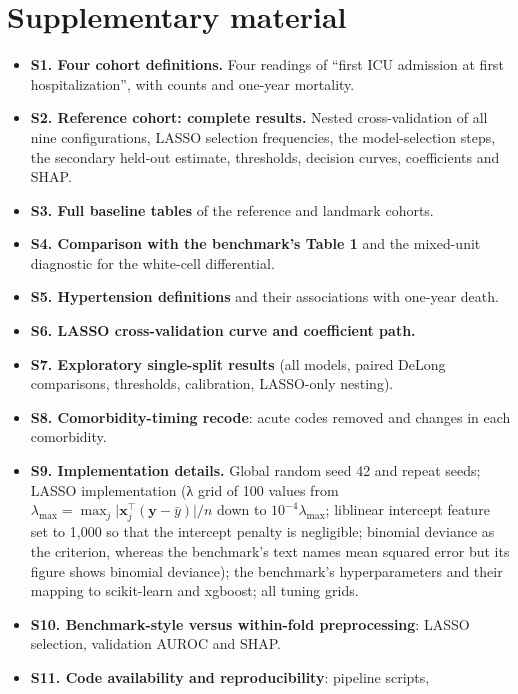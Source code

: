 \hypertarget{supplementary-material}{%
\section{Supplementary material}\label{supplementary-material}}

\begin{itemize}
\tightlist
\item
  \textbf{S1. Four cohort definitions.} Four readings of ``first ICU
  admission at first hospitalization'', with counts and one-year
  mortality.
\item
  \textbf{S2. Reference cohort: complete results.} Nested
  cross-validation of all nine configurations, LASSO selection
  frequencies, the model-selection steps, the secondary held-out
  estimate, thresholds, decision curves, coefficients and SHAP.
\item
  \textbf{S3. Full baseline tables} of the reference and landmark
  cohorts.
\item
  \textbf{S4. Comparison with the benchmark's Table 1} and the
  mixed-unit diagnostic for the white-cell differential.
\item
  \textbf{S5. Hypertension definitions} and their associations with
  one-year death.
\item
  \textbf{S6. LASSO cross-validation curve and coefficient path.}
\item
  \textbf{S7. Exploratory single-split results} (all models, paired
  DeLong comparisons, thresholds, calibration, LASSO-only nesting).
\item
  \textbf{S8. Comorbidity-timing recode}: acute codes removed and
  changes in each comorbidity.
\item
  \textbf{S9. Implementation details.} Global random seed 42 and repeat
  seeds; LASSO implementation (λ grid of 100 values from
  \(\lambda_{\max} = \max_j \lvert\mathbf{x}_j^\top(\mathbf{y} - \bar y)\rvert / n\)
  down to \(10^{-4}\lambda_{\max}\); liblinear intercept feature set to
  1,000 so that the intercept penalty is negligible; binomial deviance
  as the criterion, whereas the benchmark's text names mean squared
  error but its figure shows binomial deviance); the benchmark's
  hyperparameters and their mapping to scikit-learn and xgboost; all
  tuning grids.
\item
  \textbf{S10. Benchmark-style versus within-fold preprocessing}: LASSO
  selection, validation AUROC and SHAP.
\item
  \textbf{S11. Code availability and reproducibility}: pipeline scripts,

\end{itemize}
